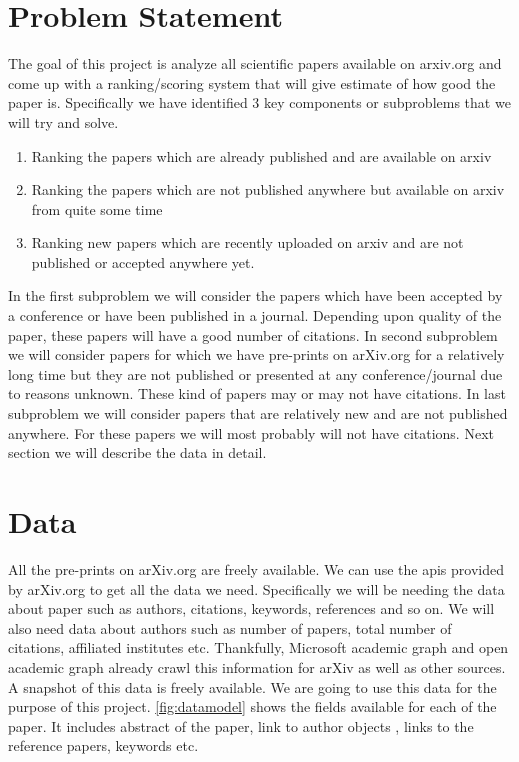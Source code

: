 \documentclass[a4paper, 11pt]{article}
\begin{document}
\section{Problem Statement}
The goal of this project is analyze all scientific papers available on arxiv.org and come up with a ranking/scoring system that will give estimate of how good the paper is. Specifically we have identified 3 key components or subproblems that we will try and solve.
\begin{enumerate}
\item Ranking the papers which are already published and are available on arxiv
\item Ranking the papers which are not published anywhere but available on arxiv from quite some time 
\item Ranking new papers which are recently uploaded on arxiv and are not published or accepted anywhere yet.
\end{enumerate}
In the first subproblem we will consider the papers which have been accepted by a conference or have been published in a journal. Depending upon quality of the paper, these papers will have a good number of citations. In second subproblem we will consider papers for which we have pre-prints on arXiv.org for a relatively long time but they are not published or presented at any conference/journal due to reasons unknown. These kind of papers may or may not have citations. In last subproblem we will consider papers that are relatively new and are not published anywhere. For these papers we will most probably will not have citations. Next section we will describe the data in detail.
\section{Data}
All the pre-prints on arXiv.org are freely available. We can use the apis provided by arXiv.org to get all the data we need. Specifically we will be needing the data about paper such as authors, citations, keywords, references and so on. We will also need data about authors such as number of papers, total number of citations, affiliated institutes etc.  Thankfully, Microsoft academic graph and open academic graph \cite{data} already crawl this information for arXiv as well as other sources. A snapshot of this data is freely available. We are going to use this data for the purpose of this project.  \ref{fig:datamodel} shows the fields available for each of the paper. It includes abstract of the paper, link to author objects , links to the reference papers, keywords etc. 
\end{document}
